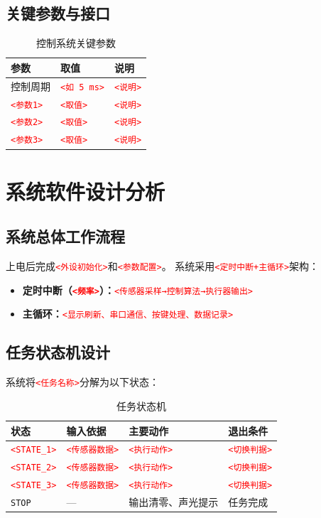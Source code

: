 \documentclass[12pt,a4paper,fontset=fandol]{ctexart}
\newcommand{\code}[1]{\texttt{\small #1}}
\newcommand{\placeholder}[1]{\textcolor{red}{\texttt{<#1>}}}
\begin{document}
\subsection{关键参数与接口}
\begin{table}[H]
\centering
\caption{控制系统关键参数}
\begin{tabularx}{\textwidth}{p{3.2cm}p{3.6cm}Y}
\toprule
参数 & 取值 & 说明\\
\midrule
控制周期 & \placeholder{如 5\,ms} & \placeholder{说明}\\
\placeholder{参数1} & \placeholder{取值} & \placeholder{说明}\\
\placeholder{参数2} & \placeholder{取值} & \placeholder{说明}\\
\placeholder{参数3} & \placeholder{取值} & \placeholder{说明}\\
\bottomrule
\end{tabularx}
\end{table}

\section{系统软件设计分析}

\subsection{系统总体工作流程}
上电后完成\placeholder{外设初始化}和\placeholder{参数配置}。
系统采用\placeholder{定时中断+主循环}架构：
\begin{itemize}
  \item \textbf{定时中断（\placeholder{频率}）：}\placeholder{传感器采样→控制算法→执行器输出}
  \item \textbf{主循环：}\placeholder{显示刷新、串口通信、按键处理、数据记录}
\end{itemize}

\subsection{任务状态机设计}
系统将\placeholder{任务名称}分解为以下状态：
\begin{table}[H]
\centering
\caption{任务状态机}
\begin{tabularx}{\textwidth}{p{2.6cm}p{2.5cm}Yp{2.7cm}}
\toprule
状态 & 输入依据 & 主要动作 & 退出条件\\
\midrule
\code{\placeholder{STATE\_1}} & \placeholder{传感器数据} & \placeholder{执行动作} & \placeholder{切换判据}\\
\code{\placeholder{STATE\_2}} & \placeholder{传感器数据} & \placeholder{执行动作} & \placeholder{切换判据}\\
\code{\placeholder{STATE\_3}} & \placeholder{传感器数据} & \placeholder{执行动作} & \placeholder{切换判据}\\
\code{STOP} & — & 输出清零、声光提示 & 任务完成\\
\bottomrule
\end{tabularx}
\end{table}
\end{document}
